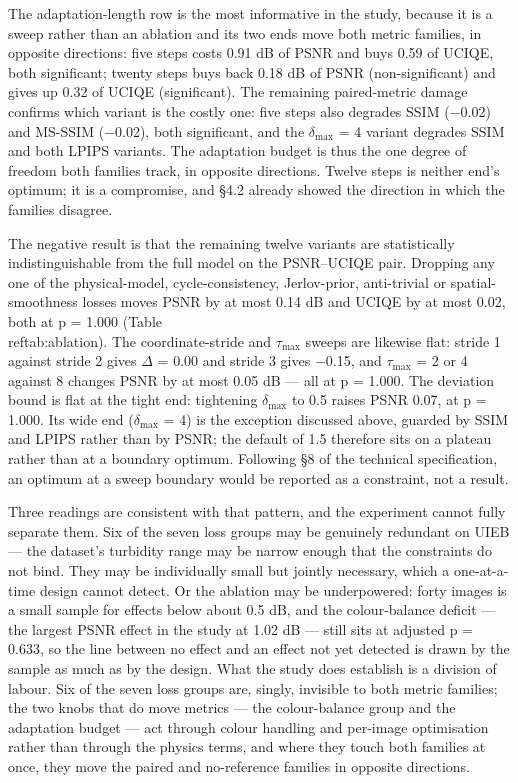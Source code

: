 \documentclass[journal]{IEEEtran}
\begin{document}
The adaptation-length row is the most informative in the study, because it is a sweep rather than an ablation and its two ends move both metric families, in opposite directions: five steps costs 0.91 dB of PSNR and buys 0.59 of UCIQE, both significant; twenty steps buys back 0.18 dB of PSNR (non-significant) and gives up 0.32 of UCIQE (significant). The remaining paired-metric damage confirms which variant is the costly one: five steps also degrades SSIM ($-$0.02) and MS-SSIM ($-$0.02), both significant, and the $\delta_{\max}$ = 4 variant degrades SSIM and both LPIPS variants. The adaptation budget is thus the one degree of freedom both families track, in opposite directions. Twelve steps is neither end's optimum; it is a compromise, and \S{}4.2 already showed the direction in which the families disagree.

The negative result is that the remaining twelve variants are statistically indistinguishable from the full model on the PSNR--UCIQE pair. Dropping any one of the physical-model, cycle-consistency, Jerlov-prior, anti-trivial or spatial-smoothness losses moves PSNR by at most 0.14 dB and UCIQE by at most 0.02, both at p = 1.000 (Table~\\ref{tab:ablation}). The coordinate-stride and $\tau_{\max}$ sweeps are likewise flat: stride 1 against stride 2 gives $\Delta$ = 0.00 and stride 3 gives $-$0.15, and $\tau_{\max}$ = 2 or 4 against 8 changes PSNR by at most 0.05 dB --- all at p = 1.000. The deviation bound is flat at the tight end: tightening $\delta_{\max}$ to 0.5 raises PSNR 0.07, at p = 1.000. Its wide end ($\delta_{\max}$ = 4) is the exception discussed above, guarded by SSIM and LPIPS rather than by PSNR; the default of 1.5 therefore sits on a plateau rather than at a boundary optimum. Following \S{}8 of the technical specification, an optimum at a sweep boundary would be reported as a constraint, not a result.

Three readings are consistent with that pattern, and the experiment cannot fully separate them. Six of the seven loss groups may be genuinely redundant on UIEB --- the dataset's turbidity range may be narrow enough that the constraints do not bind. They may be individually small but jointly necessary, which a one-at-a-time design cannot detect. Or the ablation may be underpowered: forty images is a small sample for effects below about 0.5 dB, and the colour-balance deficit --- the largest PSNR effect in the study at 1.02 dB --- still sits at adjusted p = 0.633, so the line between no effect and an effect not yet detected is drawn by the sample as much as by the design. What the study does establish is a division of labour. Six of the seven loss groups are, singly, invisible to both metric families; the two knobs that do move metrics --- the colour-balance group and the adaptation budget --- act through colour handling and per-image optimisation rather than through the physics terms, and where they touch both families at once, they move the paired and no-reference families in opposite directions.
\end{document}
